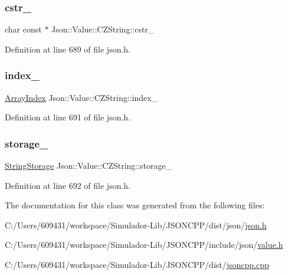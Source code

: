 \subsubsection{\texorpdfstring{cstr\+\_\+}{cstr\_}}
{\footnotesize\ttfamily char const  $\ast$ Json\+::\+Value\+::\+C\+Z\+String\+::cstr\+\_\+\hspace{0.3cm}{\ttfamily [private]}}



Definition at line 689 of file json.\+h.

\hypertarget{class_json_1_1_value_1_1_c_z_string_aecf29982235c9c165a0971023ebbb270}{}\label{class_json_1_1_value_1_1_c_z_string_aecf29982235c9c165a0971023ebbb270} 
\subsubsection{\texorpdfstring{index\+\_\+}{index\_}}
{\footnotesize\ttfamily \hyperlink{class_json_1_1_value_a184a91566cccca7b819240f0d5561c7d}{Array\+Index} Json\+::\+Value\+::\+C\+Z\+String\+::index\+\_\+}



Definition at line 691 of file json.\+h.

\hypertarget{class_json_1_1_value_1_1_c_z_string_a17c92f0f089a4314e3b1d5695dc1a851}{}\label{class_json_1_1_value_1_1_c_z_string_a17c92f0f089a4314e3b1d5695dc1a851} 
\subsubsection{\texorpdfstring{storage\+\_\+}{storage\_}}
{\footnotesize\ttfamily \hyperlink{struct_json_1_1_value_1_1_c_z_string_1_1_string_storage}{String\+Storage} Json\+::\+Value\+::\+C\+Z\+String\+::storage\+\_\+}



Definition at line 692 of file json.\+h.



The documentation for this class was generated from the following files\+:\begin{DoxyCompactItemize}
\item 
C\+:/\+Users/609431/workspace/\+Simulador-\/\+Lib/\+J\+S\+O\+N\+C\+P\+P/dist/json/\hyperlink{dist_2json_2json_8h}{json.\+h}\item 
C\+:/\+Users/609431/workspace/\+Simulador-\/\+Lib/\+J\+S\+O\+N\+C\+P\+P/include/json/\hyperlink{value_8h}{value.\+h}\item 
C\+:/\+Users/609431/workspace/\+Simulador-\/\+Lib/\+J\+S\+O\+N\+C\+P\+P/dist/\hyperlink{jsoncpp_8cpp}{jsoncpp.\+cpp}\end{DoxyCompactItemize}
